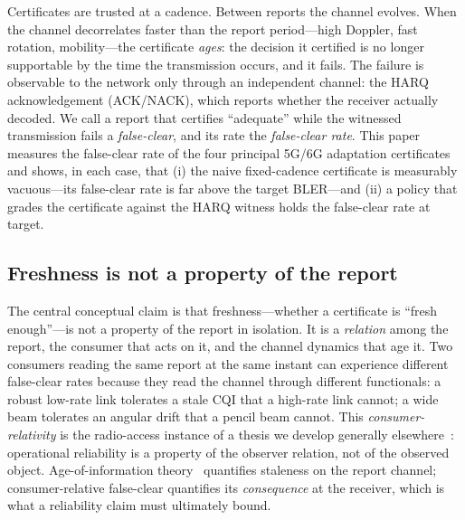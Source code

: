 \documentclass[lettersize,onecolumn]{IEEEtran}
\theoremstyle{remark}
\begin{document}
Certificates are trusted at a cadence. Between reports the channel evolves. When
the channel decorrelates faster than the report period---high Doppler, fast
rotation, mobility---the certificate \emph{ages}: the decision it certified is no
longer supportable by the time the transmission occurs, and it fails. The
failure is observable to the network only through an independent channel: the
HARQ acknowledgement (ACK/NACK), which reports whether the receiver actually
decoded. We call a report that certifies ``adequate'' while the witnessed
transmission fails a \emph{false-clear}, and its rate the \emph{false-clear
rate}. This paper measures the false-clear rate of the four principal
5G/6G adaptation certificates and shows, in each case, that (i) the naive
fixed-cadence certificate is measurably vacuous---its false-clear rate is far
above the target BLER---and (ii) a policy that grades the certificate against
the HARQ witness holds the false-clear rate at target.

\subsection{Freshness is not a property of the report}
The central conceptual claim is that freshness---whether a certificate is
``fresh enough''---is not a property of the report in isolation. It is a
\emph{relation} among the report, the consumer that acts on it, and the channel
dynamics that age it. Two consumers reading the same report at the same instant
can experience different false-clear rates because they read the channel through
different functionals: a robust low-rate link tolerates a stale CQI that a
high-rate link cannot; a wide beam tolerates an angular drift that a pencil beam
cannot. This \emph{consumer-relativity} is the radio-access instance of a thesis
we develop generally elsewhere~\cite{bond_ot}: operational reliability is a
property of the observer relation, not of the observed object.
Age-of-information theory~\cite{kaul2012aoi} quantifies staleness on the report
channel; consumer-relative false-clear quantifies its \emph{consequence} at the
receiver, which is what a reliability claim must ultimately bound.
\end{document}
